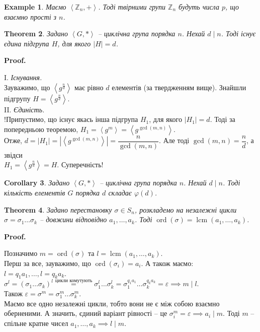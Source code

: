 \documentclass[a4paper, 10pt]{article}
\makeatletter
\theoremstyle{theoremdd}
\newtheorem{theorem}{Theorem}[subsection]
\theoremstyle{theoremdd}
\theoremstyle{theoremdd}
\theoremstyle{theoremdd}
\theoremstyle{theoremdd}
\newtheorem{example}[theorem]{Example}
\theoremstyle{theoremdd}
\theoremstyle{theoremdd}
\theoremstyle{theoremdd}
\theoremstyle{theoremdd}
\theoremstyle{theoremdd}
\theoremstyle{theoremdd}
\theoremstyle{theoremdd}
\theoremstyle{theoremdd}
\theoremstyle{theoremdd}
\newtheorem{corollary}[theorem]{Corollary}
\theoremstyle{theoremdd}
\renewenvironment{proof}[1][Proof.\\]{\par
\pushQED{\hfill \qed}%
\normalfont \topsep6\p@\@plus6\p@\relax
\trivlist
\item\relax
{\bfseries
#1\@addpunct{.}}\hspace\labelsep\ignorespaces
}{%
\popQED\endtrivlist\@endpefalse
}
\DeclareMathOperator{\ord}{ord}
\DeclareMathOperator{\lcm}{lcm}
\makeatother
\begin{document}
\begin{example}
Маємо $\left< \mathbb{Z}_n, + \right>$. Тоді твірними групи $\mathbb{Z}_n$ будуть числа $p$, що взаємно прості з $n$.
\end{example}

\begin{theorem}
Задано $\left< G, *\right>$ -- циклічна група порядка $n$. Нехай $d \mid n$. Тоді існує єдина підгрупа $H$, для якого $|H| = d$.
\end{theorem}

\begin{proof}
I. \textit{Існування.}\\
Зауважимо, що $\left< g^{\frac{n}{d}} \right>$ має рівно $d$ елементів (за твердженням вище). Знайшли підгрупу $H = \left< g^{\frac{n}{d}} \right>$.
\bigskip \\
II. \textit{Єдиність.}\\
!Припустимо, що існує якась інша підгрупа $H_1$, для якого $|H_1| = d$. Тоді за попередньою теоремою, $H_1 = \left<g^m\right> = \left<g^{\gcd(m,n)}\right>$.\\
Отже, $d = |H_1| = |\left<g^{\gcd(m,n)}\right>| = \dfrac{n}{\gcd(m,n)}$. Але тоді $\gcd(m,n) = \dfrac{n}{d}$, а звідси\\
$H_1 = \left< g^{\frac{n}{d}} \right> = H$. Суперечність!
\end{proof}

\begin{corollary}
Задано $\left< G, *\right>$ -- циклічна група порядка $n$. Нехай $d \mid n$. Тоді кількість елементів $G$ порядка $d$ складає $\varphi(d)$.
\end{corollary}

\begin{theorem}
Задано перестановку $\sigma \in S_n$, розкладемо на незалежні цикли $\sigma = \sigma_1 \dots \sigma_k$ -- довжини відповідно $a_1,\dots,a_k$. Тоді $\ord (\sigma) = \lcm(a_1,\dots,a_k)$.
\end{theorem}

\begin{proof}
Позначимо $m = \ord(\sigma)$ та $l = \lcm(a_1,\dots,a_k)$.\\
Перш за все, зауважимо, що $\ord(\sigma_i) = a_i$. А також маємо:\\
$l = q_1a_1, \dots, l = q_ka_k$.\\
$\sigma^l = (\sigma_1 \dots \sigma_k)^l\overset{\text{цикли комутують}}{=} \sigma_1^l \dots \sigma_k^l = \sigma_1^{q_1 a_1} \dots \sigma_k^{q_k a_k} = \varepsilon \implies m \mid l$.\\
Також $\varepsilon = \sigma^m = \sigma_1^m \dots \sigma_k^m$.\\
Маємо все одно незалежні цикли, тобто вони не є між собою взаємно оберненими. А значить, єдиний варіант рівності -- це $\sigma_i^m = \varepsilon \implies a_i \mid m$. Тоді $m$ -- спільне кратне чисел $a_1,\dots,a_k \implies l \mid m$.
\end{proof}
\end{document}
